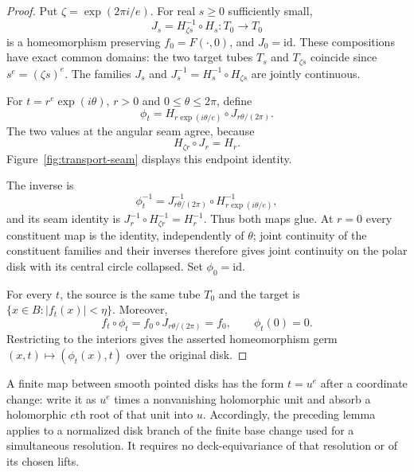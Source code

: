 \begin{proof}
Put $\zeta=\exp(2\pi i/e)$. For real $s\ge0$ sufficiently small,
\[
 J_s=H_{\zeta s}^{-1}\circ H_s:T_0\longrightarrow T_0
\]
is a homeomorphism preserving $f_0=F(\cdot,0)$, and $J_0=\mathrm{id}$.
These compositions have exact common domains: the two target tubes
$T_s$ and $T_{\zeta s}$ coincide since $s^e=(\zeta s)^e$.
The families $J_s$ and $J_s^{-1}=H_s^{-1}\circ H_{\zeta s}$ are jointly
continuous.

For $t=r^e\exp(i\theta)$, $r>0$ and $0\le\theta\le2\pi$, define
\[
 \phi_t
 =H_{r\exp(i\theta/e)}\circ J_{r\theta/(2\pi)}.
\]
The two values at the angular seam agree, because
\[
 H_{\zeta r}\circ J_r=H_r.
\]
Figure~\ref{fig:transport-seam} displays this endpoint identity.

The inverse is
\[
 \phi_t^{-1}
 =J_{r\theta/(2\pi)}^{-1}\circ H_{r\exp(i\theta/e)}^{-1},
\]
and its seam identity is
$J_r^{-1}\circ H_{\zeta r}^{-1}=H_r^{-1}$.
Thus both maps glue. At $r=0$ every constituent map is the identity,
independently of $\theta$; joint continuity of the constituent families
and their inverses therefore gives joint continuity on the polar disk
with its central circle collapsed. Set $\phi_0=\mathrm{id}$.

For every $t$, the source is the same tube $T_0$ and the target is
$\{x\in B:|f_t(x)|<\eta\}$. Moreover,
\[
 f_t\circ\phi_t=f_0\circ J_{r\theta/(2\pi)}=f_0,
 \qquad \phi_t(0)=0.
\]
Restricting to the interiors gives the asserted homeomorphism germ
$(x,t)\mapsto(\phi_t(x),t)$ over the original disk.
\end{proof}

\begin{remark}
A finite map between smooth pointed disks has the form $t=u^e$ after
a coordinate change: write it as $u^e$ times a nonvanishing holomorphic
unit and absorb a holomorphic $e$th root of that unit into $u$.
Accordingly, the preceding lemma applies to a normalized disk branch of
the finite base change used for a simultaneous resolution. It requires
no deck-equivariance of that resolution or of its chosen lifts.
\end{remark}
